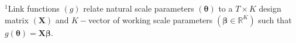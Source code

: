 \documentclass[12pt]{article}\usepackage[]{graphicx}\usepackage[]{color}
\begin{document}
\begin{small}
\begin{table}
\begin{tabular}{llll}
  \bottomrule
  \end{tabular}
  \footnotesize{$^1$Link functions $(g)$ relate natural scale parameters $({\boldsymbol \theta})$ to a $T \times K$ design matrix $({\mathbf X})$ and $K-$vector of working scale parameters $(\boldsymbol{\beta}\in \mathbb{R}^K)$ such that $g({\boldsymbol \theta})={\mathbf X}\boldsymbol{\beta}$. %
}
\end{table}
\end{small}


\end{document}
